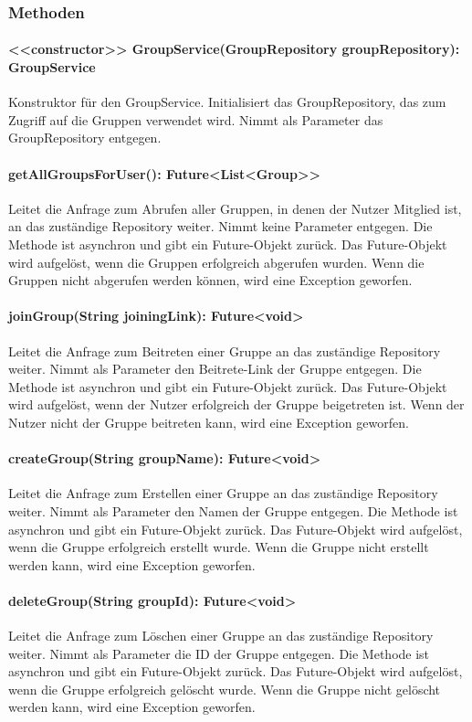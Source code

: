 \documentclass[parskip=full]{scrartcl}
\begin{document}
\subsubsection{Methoden}
\paragraph{<<constructor>> GroupService(GroupRepository groupRepository): GroupService}
Konstruktor für den GroupService. Initialisiert das GroupRepository, das zum Zugriff auf die Gruppen verwendet wird. Nimmt als Parameter das GroupRepository entgegen.
\paragraph{getAllGroupsForUser(): Future<List<Group>>}
Leitet die Anfrage zum Abrufen aller Gruppen, in denen der Nutzer Mitglied ist, an das zuständige Repository weiter. Nimmt keine Parameter entgegen. Die Methode ist asynchron und gibt ein Future-Objekt zurück. Das Future-Objekt wird aufgelöst, wenn die Gruppen erfolgreich abgerufen wurden. Wenn die Gruppen nicht abgerufen werden können, wird eine Exception geworfen.
\paragraph{joinGroup(String joiningLink): Future<void>}
Leitet die Anfrage zum Beitreten einer Gruppe an das zuständige Repository weiter. Nimmt als Parameter den Beitrete-Link der Gruppe entgegen. Die Methode ist asynchron und gibt ein Future-Objekt zurück. Das Future-Objekt wird aufgelöst, wenn der Nutzer erfolgreich der Gruppe beigetreten ist. Wenn der Nutzer nicht der Gruppe beitreten kann, wird eine Exception geworfen.
\paragraph{createGroup(String groupName): Future<void>}
Leitet die Anfrage zum Erstellen einer Gruppe an das zuständige Repository weiter. Nimmt als Parameter den Namen der Gruppe entgegen. Die Methode ist asynchron und gibt ein Future-Objekt zurück. Das Future-Objekt wird aufgelöst, wenn die Gruppe erfolgreich erstellt wurde. Wenn die Gruppe nicht erstellt werden kann, wird eine Exception geworfen.
\paragraph{deleteGroup(String groupId): Future<void>}
Leitet die Anfrage zum Löschen einer Gruppe an das zuständige Repository weiter. Nimmt als Parameter die ID der Gruppe entgegen. Die Methode ist asynchron und gibt ein Future-Objekt zurück. Das Future-Objekt wird aufgelöst, wenn die Gruppe erfolgreich gelöscht wurde. Wenn die Gruppe nicht gelöscht werden kann, wird eine Exception geworfen.
\end{document}
